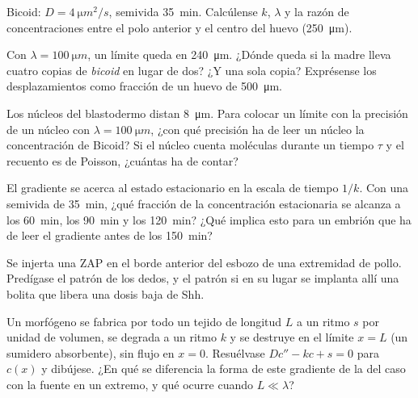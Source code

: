 \begin{exercise}[$\star\star$]\label{exo:b3:developmental-genetics:5}
Bicoid: $D = \qty{4}{\micro m^2/s}$, semivida \qty{35}{min}. Calcúlense
$k$, $\lambda$ y la razón de concentraciones entre el polo anterior y
el centro del huevo (\qty{250}{\micro m}).
\end{exercise}

\begin{exercise}[$\star\star$]\label{exo:b3:developmental-genetics:6}
Con $\lambda = \qty{100}{\micro m}$, un límite queda en
\qty{240}{\micro m}. ¿Dónde queda si la madre lleva cuatro copias de
\emph{bicoid} en lugar de dos? ¿Y una sola copia? Exprésense los
desplazamientos como fracción de un huevo de \qty{500}{\micro m}.
\end{exercise}

\begin{exercise}[$\star\star$]\label{exo:b3:developmental-genetics:7}
Los núcleos del blastodermo distan \qty{8}{\micro m}. Para colocar un
límite con la precisión de un núcleo con
$\lambda = \qty{100}{\micro m}$, ¿con qué precisión ha de leer un
núcleo la concentración de Bicoid? Si el núcleo cuenta moléculas
durante un tiempo $\tau$ y el recuento es de Poisson, ¿cuántas ha de
contar?
\end{exercise}

\begin{exercise}[$\star\star$]\label{exo:b3:developmental-genetics:8}
El gradiente se acerca al estado estacionario en la escala de tiempo
$1/k$. Con una semivida de \qty{35}{min}, ¿qué fracción de la
concentración estacionaria se alcanza a los \qty{60}{min}, los
\qty{90}{min} y los \qty{120}{min}? ¿Qué implica esto para un embrión
que ha de leer el gradiente antes de los \qty{150}{min}?
\end{exercise}

\begin{exercise}[$\star\star$]\label{exo:b3:developmental-genetics:9}
Se injerta una ZAP en el borde anterior del esbozo de una extremidad de
pollo. Predígase el patrón de los dedos, y el patrón si en su lugar se
implanta allí una bolita que libera una dosis baja de Shh.
\end{exercise}

\begin{exercise}[$\star\star\star$]\label{exo:b3:developmental-genetics:10}
Un morfógeno se fabrica por todo un tejido de longitud $L$ a un ritmo
$s$ por unidad de volumen, se degrada a un ritmo $k$ y se destruye en
el límite $x =
L$ (un sumidero absorbente), sin flujo en $x = 0$. Resuélvase $Dc'' - kc + s =
0$ para $c(x)$ y dibújese. ¿En qué se diferencia la forma de este
gradiente de la del caso con la fuente en un extremo, y qué ocurre
cuando $L \ll \lambda$?
\end{exercise}

